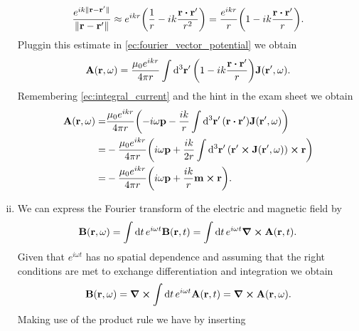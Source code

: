 \documentclass{article}
\begin{document}
\begin{enumerate}[(i)]
\begin{equation}
\frac{e^{ik\|\vb{r}-\vb{r}'\|}}{\|\vb{r}-\vb{r}'\|}\approx e^{ikr}\qty(\frac{1}{r}-ik\frac{\vb{r}\vdot\vb{r}'}{r^2})=\frac{e^{ikr}}{r}\qty(1-ik\frac{\vb{r}\vdot\vb{r}'}{r}).
\end{equation}
Pluggin this estimate in \eqref{ec:fourier_vector_potential} we obtain
\begin{equation}
\vb{A}(\vb{r},\omega)=\frac{\mu_0e^{ikr}}{4\pi r}\int \dd[3]{\vb{r}'}\qty(1-ik\frac{\vb{r}\vdot\vb{r}'}{r})\vb{J}(\vb{r}',\omega).
\end{equation}
Remembering \eqref{ec:integral_current} and the hint in the exam sheet we obtain
\begin{align}
\begin{split}
\vb{A}(\vb{r},\omega)=&\frac{\mu_0e^{ikr}}{4\pi r}\qty(-i\omega\vb{p}-\frac{ik}{r}\int\dd[3]{\vb{r}'}(\vb{r}\vdot\vb{r}')\vb{J}(\vb{r}',\omega))\\
=&-\frac{\mu_0e^{ikr}}{4\pi r}\qty(i\omega\vb{p}+\frac{ik}{2r}\int\dd[3]{\vb{r}'}(\vb{r}'\cross\vb{J}(\vb{r}',\omega))\cross\vb{r})\\
=&-\frac{\mu_0e^{ikr}}{4\pi r}\qty(i\omega\vb{p}+\frac{ik}{r}\vb{m}\cross\vb{r}).
\end{split}
\end{align}

\item We can express the Fourier transform of the electric and magnetic field by
\begin{equation}
\vb{B}(\vb{r},\omega)=\int\dd{t}e^{i\omega t}\vb{B}(\vb{r},t)=\int\dd{t}e^{i\omega t}\curl{\vb{A}}(\vb{r},t).
\end{equation}
Given that $e^{i\omega t}$ has no spatial dependence and assuming that the right conditions are met to exchange differentiation and integration we obtain
\begin{equation}
\vb{B}(\vb{r},\omega)=\curl{\int\dd{t}e^{i\omega t}\vb{A}(\vb{r},t)}=\curl{\vb{A}}(\vb{r},\omega).
\end{equation}
Making use of the product rule we have by inserting 

\end{enumerate}
\end{document}
